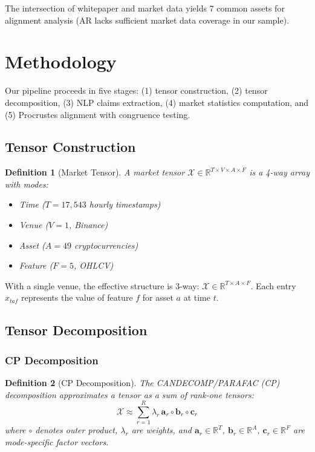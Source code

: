 \documentclass[11pt,twocolumn]{article}
\newtheorem{definition}{Definition}
\begin{document}
The intersection of whitepaper and market data yields 7 common assets for alignment analysis (AR lacks sufficient market data coverage in our sample).

\section{Methodology}
\label{sec:methodology}

Our pipeline proceeds in five stages: (1) tensor construction, (2) tensor decomposition, (3) NLP claims extraction, (4) market statistics computation, and (5) Procrustes alignment with congruence testing.

\subsection{Tensor Construction}

\begin{definition}[Market Tensor]
A market tensor $\mathcal{X} \in \mathbb{R}^{T \times V \times A \times F}$ is a 4-way array with modes:
\begin{itemize}
    \item Time ($T = 17,543$ hourly timestamps)
    \item Venue ($V = 1$, Binance)
    \item Asset ($A = 49$ cryptocurrencies)
    \item Feature ($F = 5$, OHLCV)
\end{itemize}
\end{definition}

With a single venue, the effective structure is 3-way: $\mathcal{X} \in \mathbb{R}^{T \times A \times F}$. Each entry $x_{taf}$ represents the value of feature $f$ for asset $a$ at time $t$.

\subsection{Tensor Decomposition}

\subsubsection{CP Decomposition}

\begin{definition}[CP Decomposition]
The CANDECOMP/PARAFAC (CP) decomposition approximates a tensor as a sum of rank-one tensors:
\begin{equation}
\mathcal{X} \approx \sum_{r=1}^{R} \lambda_r \, \mathbf{a}_r \circ \mathbf{b}_r \circ \mathbf{c}_r
\end{equation}
where $\circ$ denotes outer product, $\lambda_r$ are weights, and $\mathbf{a}_r \in \mathbb{R}^T$, $\mathbf{b}_r \in \mathbb{R}^A$, $\mathbf{c}_r \in \mathbb{R}^F$ are mode-specific factor vectors.
\end{definition}
\end{document}
